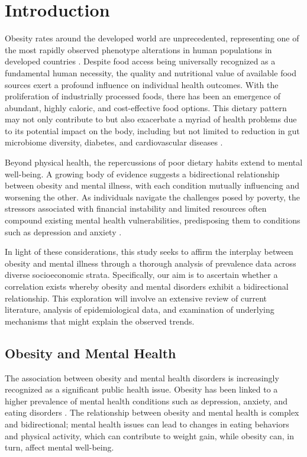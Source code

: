 \documentclass[runningheads]{llncs}
\begin{document}
\section{Introduction}
Obesity rates around the developed world are unprecedented, representing one of the most rapidly observed phenotype alterations in human populations in developed countries \cite{Bentley2018}. Despite food access being universally recognized as a fundamental human necessity, the quality and nutritional value of available food sources exert a profound influence on individual health outcomes. With the proliferation of industrially processed foods, there has been an emergence of abundant, highly caloric, and cost-effective food options. This dietary pattern may not only contribute to but also exacerbate a myriad of health problems due to its potential impact on the body, including but not limited to reduction in gut microbiome diversity, diabetes, and cardiovascular diseases \cite{Bentley2018,Smits2017,Muscogiuri2018}.

Beyond physical health, the repercussions of poor dietary habits extend to mental well-being. A growing body of evidence suggests a bidirectional relationship between obesity and mental illness, with each condition mutually influencing and worsening the other. As individuals navigate the challenges posed by poverty, the stressors associated with financial instability and limited resources often compound existing mental health vulnerabilities, predisposing them to conditions such as depression and anxiety \cite{Zhang2021}.

In light of these considerations, this study seeks to affirm the interplay between obesity and mental illness through a thorough analysis of prevalence data across diverse socioeconomic strata. Specifically, our aim is to ascertain whether a correlation exists whereby obesity and mental disorders exhibit a bidirectional relationship. This exploration will involve an extensive review of current literature, analysis of epidemiological data, and examination of underlying mechanisms that might explain the observed trends.

\subsection{Obesity and Mental Health}
The association between obesity and mental health disorders is increasingly recognized as a significant public health issue. Obesity has been linked to a higher prevalence of mental health conditions such as depression, anxiety, and eating disorders \cite{Luppino2010}. The relationship between obesity and mental health is complex and bidirectional; mental health issues can lead to changes in eating behaviors and physical activity, which can contribute to weight gain, while obesity can, in turn, affect mental well-being.
\end{document}
